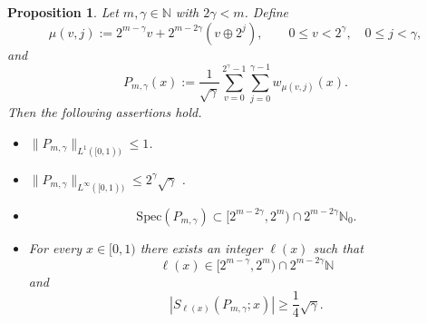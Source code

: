 \documentclass[10pt,a4paper]{amsart}
\newtheorem{proposition}{Proposition}
\begin{document}
\begin{proposition}
\label{prop:block} Let $m,\gamma\in\mathbb{N}$ with $2\gamma<m$. Define 
\begin{equation}  \label{eq:def-mu}
\mu(v,j):=2^{m-\gamma}v+2^{m-2\gamma}(v\oplus 2^j), \qquad 0\le
v<2^{\gamma}, \quad 0\le j<\gamma,
\end{equation}
and 
\begin{equation}  \label{eq:def-P}
P_{m,\gamma}(x):=\frac{1}{\sqrt{\gamma}}\sum_{v=0}^{2^{\gamma}-1}%
\sum_{j=0}^{\gamma-1} w_{\mu(v,j)}(x).
\end{equation}
Then the following assertions hold.

\begin{itemize}
\item[(i)] $\|P_{m,\gamma}\|_{L^{1}([0,1))}\le1$.

\item[(ii)] $\|P_{m,\gamma}\|_{L^{\infty}([0,1))}\le 2^{\gamma}\sqrt{\gamma}$%
.

\item[(iii)] 
\begin{equation*}
\mathrm{Spec}(P_{m,\gamma})\subset [2^{m-2\gamma},2^m)\cap 2^{m-2\gamma}%
\mathbb{N}_0.
\end{equation*}

\item[(iv)] For every $x\in[0,1)$ there exists an integer $\ell(x)$ such
that 
\begin{equation*}
\ell(x)\in [2^{m-\gamma},2^m)\cap 2^{m-2\gamma}\mathbb{N}
\end{equation*}
and 
\begin{equation*}
|S_{\ell(x)}(P_{m,\gamma};x)|\ge \frac14\sqrt{\gamma}.
\end{equation*}
\end{itemize}
\end{proposition}
\end{document}

